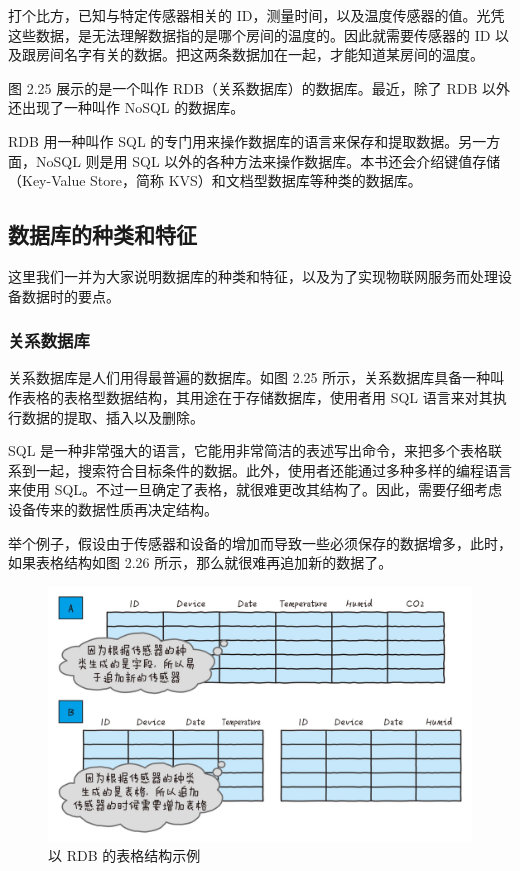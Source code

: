 \documentclass[12pt,UTF8]{ctexbook}
\begin{document}
打个比方，已知与特定传感器相关的 ID，测量时间，以及温度传感器的值。光凭这些数据，是无法理解数据指的是哪个房间的温度的。因此就需要传感器的 ID 以及跟房间名字有关的数据。把这两条数据加在一起，才能知道某房间的温度。

图 2.25 展示的是一个叫作 RDB（关系数据库）的数据库。最近，除了 RDB 以外还出现了一种叫作 NoSQL 的数据库。

RDB 用一种叫作 SQL 的专门用来操作数据库的语言来保存和提取数据。另一方面，NoSQL 则是用 SQL 以外的各种方法来操作数据库。本书还会介绍键值存储（Key-Value Store，简称 KVS）和文档型数据库等种类的数据库。

\subsection{数据库的种类和特征}

这里我们一并为大家说明数据库的种类和特征，以及为了实现物联网服务而处理设备数据时的要点。

\subsubsection{关系数据库}

关系数据库是人们用得最普遍的数据库。如图 2.25 所示，关系数据库具备一种叫作表格的表格型数据结构，其用途在于存储数据库，使用者用 SQL 语言来对其执行数据的提取、插入以及删除。

SQL 是一种非常强大的语言，它能用非常简洁的表述写出命令，来把多个表格联系到一起，搜索符合目标条件的数据。此外，使用者还能通过多种多样的编程语言来使用 SQL。不过一旦确定了表格，就很难更改其结构了。因此，需要仔细考虑设备传来的数据性质再决定结构。

举个例子，假设由于传感器和设备的增加而导致一些必须保存的数据增多，此时，如果表格结构如图 2.26 所示，那么就很难再追加新的数据了。

\begin{figure}[htbp]
	\centering
	\includegraphics[width=1\linewidth]{45}
	\caption{以 RDB 的表格结构示例}
	\label{fig:1}
\end{figure}
\end{document}
